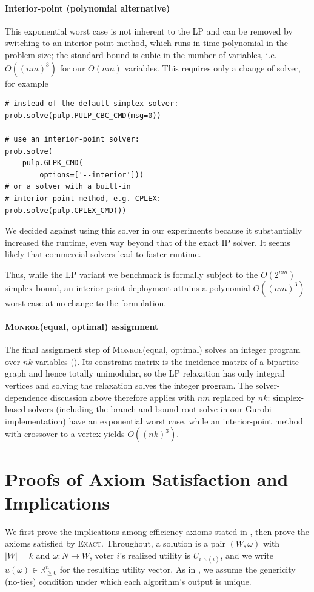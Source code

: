 \documentclass[11pt]{article}
\newcommand{\Exact}{\textsc{Exact}}
\newcommand{\LP}{\textsc{LP}}
\newcommand{\Monroe}{\textsc{Monroe}}
\begin{document}
\paragraph{Interior-point (polynomial alternative)} This exponential worst case is not inherent to the LP and can be removed by switching to an interior-point method, which runs in time polynomial in the problem size; the standard bound is cubic in the number of variables, i.e.\ $O((nm)^3)$ for our $O(nm)$ variables. This requires only a change of solver, for example
\begin{verbatim}
# instead of the default simplex solver:
prob.solve(pulp.PULP_CBC_CMD(msg=0))

# use an interior-point solver:
prob.solve(
    pulp.GLPK_CMD(
        options=['--interior']))
# or a solver with a built-in
# interior-point method, e.g. CPLEX:
prob.solve(pulp.CPLEX_CMD())
\end{verbatim}
We decided against using this solver in our experiments because it substantially increased the runtime, even way beyond that of the exact IP solver. It seems likely that commercial solvers lead to faster runtime.

Thus, while the \LP{} variant we benchmark is formally subject to the $O(2^{nm})$ simplex bound, an interior-point deployment attains a polynomial $O((nm)^3)$ worst case at no change to the formulation.

\paragraph{\Monroe(equal, optimal) assignment} The final assignment step of \Monroe(equal, optimal) solves an integer program over $nk$ variables (). Its constraint matrix is the incidence matrix of a bipartite graph and hence totally unimodular, so the LP relaxation has only integral vertices and solving the relaxation solves the integer program. The solver-dependence discussion above therefore applies with $nm$ replaced by $nk$: simplex-based solvers (including the branch-and-bound root solve in our Gurobi implementation) have an exponential worst case, while an interior-point method with crossover to a vertex yields $O((nk)^3)$.


\section{Proofs of Axiom Satisfaction and Implications}
\label{app:axiom-proofs}
We first prove the implications among efficiency axioms stated in , then prove the axioms satisfied by \Exact{}. Throughout, a solution is a pair $(W,\omega)$ with $|W|=k$ and $\omega:N\to W$, voter $i$'s realized utility is $U_{i,\omega(i)}$, and we write $u(\omega)\in\mathbb{R}_{\ge0}^n$ for the resulting utility vector. As in , we assume the genericity (no-ties) condition under which each algorithm's output is unique.
\end{document}
